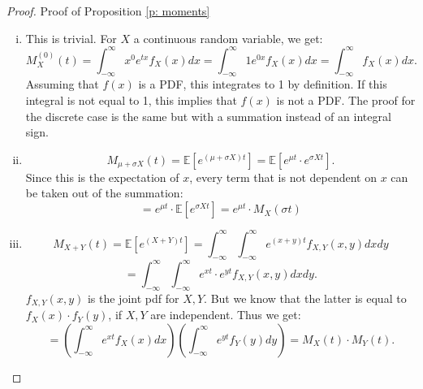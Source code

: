 \begin{proof}
    Proof of Proposition \ref{p: moments}
    \begin{enumerate}[(i)]
        \item This is trivial. For \(X\) a continuous random variable, we get: 
        \[ M_X^{(0)}(t) = \int_{-\infty}^{\infty} x^0 e^{t x } f_X(x) dx = \int_{-\infty}^{\infty} 1 e^{0 x } f_X(x) dx = \int_{-\infty}^{\infty} f_X(x) dx.\] Assuming that \(f(x)\) is a PDF, this integrates to 1 by definition. If this integral is not equal to 1, this implies that \(f(x)\) is not a PDF. The proof for the discrete case is the same but with a summation instead of an integral sign.
        \item \[M_{\mu + \sigma X}(t) = \mathbb{E}[e^{(\mu + \sigma X)t}] = \mathbb{E}[e^{\mu t} \cdot e^{\sigma X t}].\] Since this is the expectation of \(x\), every term that is not dependent on \(x\) can be taken out of the summation:
        \[ = e^{\mu t} \cdot \mathbb{E}[e^{\sigma X t}] = e^{\mu t} \cdot M_{ X}(\sigma t)\]
        \item 
        \[M_{X+Y}(t) = \mathbb{E}[e^{(X + Y)t}] = \int_{-\infty}^{\infty} \int_{-\infty}^{\infty} e^{(x + y)t} f_{X, Y}(x, y) dx dy\] 
        \[= \int_{-\infty}^{\infty} \int_{-\infty}^{\infty} e^{xt} \cdot e^{yt} f_{X, Y}(x, y) dx dy.\] 
        \(f_{X, Y}(x, y)\) is the joint pdf for \(X, Y\). But we know that the latter is equal to \(f_X(x) \cdot f_Y(y)\), if \(X, Y\) are independent. Thus we get:
        \[ = \left(\int_{-\infty}^{\infty}  e^{xt} f_X(x) dx\right) \left(\int_{-\infty}^{\infty}  e^{yt} f_Y(y) dy\right) = M_X(t) \cdot M_Y(t).\] 
    \end{enumerate}
\end{proof}

